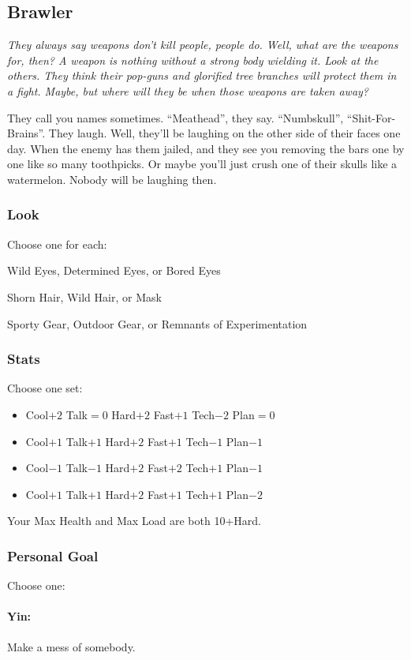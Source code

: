 \subsection{Brawler}
{\itshape They always say weapons don't kill people, people do. Well,
  what are the weapons for, then? A weapon is nothing without a strong
  body wielding it. Look at the others. They think their pop-guns and
  glorified tree branches will protect them in a fight. Maybe, but
  where will they be when those weapons are taken away?

They call you names sometimes. ``Meathead'', they say. ``Numbskull'',
``Shit-For-Brains''. They laugh. Well, they'll be laughing on the
other side of their faces one day. When the enemy has them jailed, and
they see you removing the bars one by one like so many toothpicks. Or
maybe you'll just crush one of their skulls like a watermelon. Nobody
will be laughing then.}

\subsubsection{Look}
Choose one for each:

Wild Eyes, Determined Eyes, or Bored Eyes

Shorn Hair, Wild Hair, or Mask

Sporty Gear, Outdoor Gear, or Remnants of Experimentation

\subsubsection{Stats}
Choose one set:
\begin{itemize}
\setlength\itemsep{0em}
\item Cool$+2$ Talk${=}0$ Hard$+2$ Fast$+1$ Tech$-2$ Plan${=}0$
\item Cool$+1$ Talk$+1$ Hard$+2$ Fast$+1$ Tech$-1$ Plan$-1$
\item Cool$-1$ Talk$-1$ Hard$+2$ Fast$+2$ Tech$+1$ Plan$-1$
\item Cool$+1$ Talk$+1$ Hard$+2$ Fast$+1$ Tech$+1$ Plan$-2$
\end{itemize}

Your Max Health and Max Load are both 10+Hard.

\subsubsection{Personal Goal}
Choose one:
\paragraph{Yin:} Make a mess of somebody.
